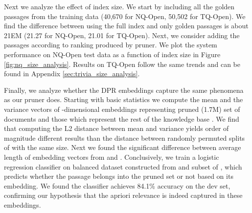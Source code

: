 \documentclass[11pt,a4paper]{article}
\begin{document}
\begin{description}[style=unboxed,leftmargin=0em,listparindent=\parindent]
\item[Effect of index size.]
Next we analyze the effect of index size. 
We start by including all the golden passages from the training data (40,670 for NQ-Open, 50,502 for TQ-Open). 
We find the difference between using the full index and only golden passages is about 21EM (21.27 for NQ-Open, 21.01 for TQ-Open). 
Next, we consider adding the passages according to ranking produced by pruner.
We plot the system performance on NQ-Open test data as a function of index size in Figure \ref{fig:nq_size_analysis}. 
Results on TQ-Open follow the same trends and can be found in Appendix \ref{sec:trivia_size_analysis}.

\item[Connection between retrieval embeddings and pruner.]
\label{sec:results_and_analysis_embconnection}
Finally, we analyze whether the DPR embeddings capture the same phenomena as our pruner does. 
Starting with basic statistics we compute the mean and the variance vectors of -dimensional embeddings representing pruned (1.7M) set of documents  and those which represent the rest of the knowledge base . 
We find that computing the L2 distance between mean and variance yields order of magnitude different results than the distance between randomly permuted splits of  with the same size. 
Next we found the significant difference between average length of embedding vectors from  and . 
Conclusively, we train a logistic regression classifier on balanced dataset constructed from  and subset of , which predicts whether the passage belongs into the pruned set  or not based on its embedding. 
We found the classifier achieves 84.1\% accuracy on the dev set, confirming our hypothesis that the apriori relevance is indeed captured in these embeddings.

\end{description}
\end{document}
